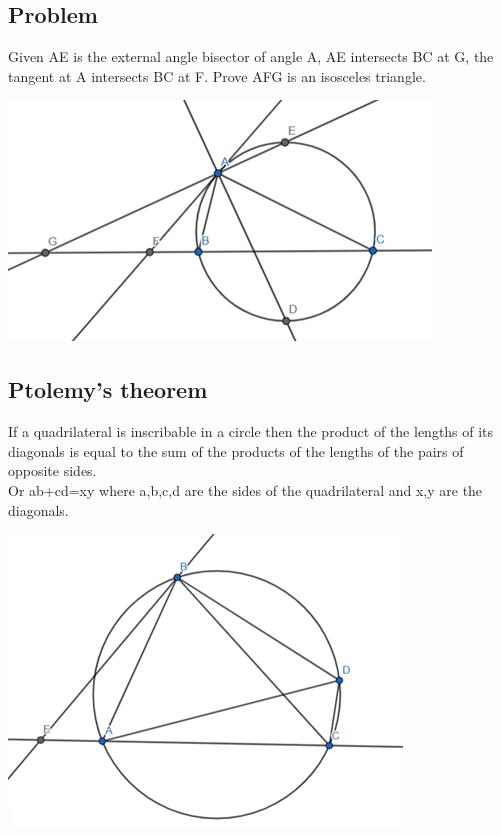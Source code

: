 \documentclass{article}
\begin{document}
\pagebreak

\subsection{Problem}

Given AE is the external angle bisector of angle A, 
AE intersects BC at G, 
the tangent at A intersects BC at F. 
Prove AFG is an isosceles triangle.

\includegraphics{Picture19.png}

\pagebreak

\subsection{Ptolemy's theorem}

If a quadrilateral is inscribable in a circle then the product of the lengths of its diagonals is equal to the sum of the products of the lengths of the pairs of opposite sides.
\\Or ab+cd=xy where a,b,c,d are the sides of the quadrilateral and x,y are the diagonals.

\includegraphics{Picture20.png}
\end{document}
